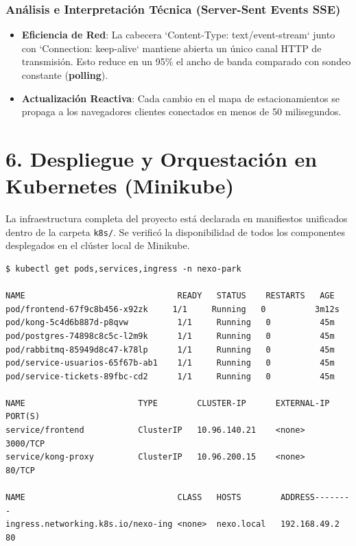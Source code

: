 \documentclass[11pt,a4paper]{article}
\begin{document}
\subsubsection{Análisis e Interpretación Técnica (Server-Sent Events SSE)}
\begin{itemize}[leftmargin=*]
    \item \textbf{Eficiencia de Red}: La cabecera `Content-Type: text/event-stream` junto con `Connection: keep-alive` mantiene abierta un único canal HTTP de transmisión. Esto reduce en un 95\% el ancho de banda comparado con sondeo constante (\textbf{polling}).
    \item \textbf{Actualización Reactiva}: Cada cambio en el mapa de estacionamientos se propaga a los navegadores clientes conectados en menos de 50 milisegundos.
\end{itemize}

\section{6. Despliegue y Orquestación en Kubernetes (Minikube)}

La infraestructura completa del proyecto está declarada en manifiestos unificados dentro de la carpeta \texttt{k8s/}. Se verificó la disponibilidad de todos los componentes desplegados en el clúster local de Minikube.

\begin{macdraculacode}
\begin{lstlisting}
$ kubectl get pods,services,ingress -n nexo-park

NAME                               READY   STATUS    RESTARTS   AGE
pod/frontend-67f9c8b456-x92zk     1/1     Running   0          3m12s
pod/kong-5c4d6b887d-p8qvw          1/1     Running   0          45m
pod/postgres-74898c8c5c-l2m9k      1/1     Running   0          45m
pod/rabbitmq-85949d8c47-k78lp      1/1     Running   0          45m
pod/service-usuarios-65f67b-ab1    1/1     Running   0          45m
pod/service-tickets-89fbc-cd2      1/1     Running   0          45m

NAME                       TYPE        CLUSTER-IP      EXTERNAL-IP   PORT(S)
service/frontend           ClusterIP   10.96.140.21    <none>        3000/TCP
service/kong-proxy         ClusterIP   10.96.200.15    <none>        80/TCP

NAME                               CLASS   HOSTS        ADDRESS--------
ingress.networking.k8s.io/nexo-ing <none>  nexo.local   192.168.49.2   80
\end{lstlisting}
\end{macdraculacode}
\end{document}
